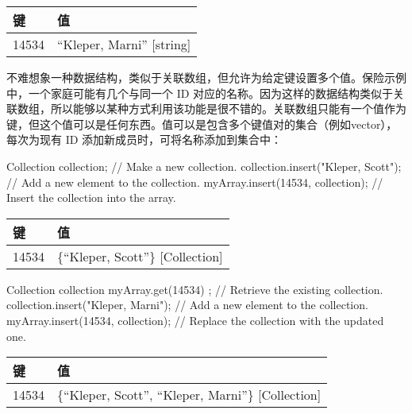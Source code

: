\begin{longtable}{|l|l|}
\hline
\textbf{键} & \textbf{值}              \\ \hline
\endfirsthead
%
\endhead
%
14534         & “Kleper, Marni” {[}string{]} \\ \hline
\end{longtable}

不难想象一种数据结构，类似于关联数组，但允许为给定键设置多个值。保险示例中，一个家庭可能有几个与同一个 ID 对应的名称。因为这样的数据结构类似于关联数组，所以能够以某种方式利用该功能是很不错的。关联数组只能有一个值作为键，但这个值可以是任何东西。值可以是包含多个键值对的集合（例如vector），每次为现有 ID 添加新成员时，可将名称添加到集合中：

\begin{cpp}
Collection collection; // Make a new collection.
collection.insert("Kleper, Scott"); // Add a new element to the collection.
myArray.insert(14534, collection); // Insert the collection into the array.
\end{cpp}

\begin{longtable}{|l|l|}
\hline
\textbf{键} & \textbf{值}                      \\ \hline
\endfirsthead
%
\endhead
%
14534         & \{“Kleper, Scott”\} {[}Collection{]} \\ \hline
\end{longtable}

\begin{cpp}
Collection collection { myArray.get(14534) }; // Retrieve the existing collection.
collection.insert("Kleper, Marni"); // Add a new element to the collection.
myArray.insert(14534, collection); // Replace the collection with the updated one.
\end{cpp}

\begin{longtable}{|l|l|}
\hline
\textbf{键} & \textbf{值}                                       \\ \hline
\endfirsthead
%
\endhead
%
14534         & \{“Kleper, Scott”, “Kleper, Marni”\} {[}Collection{]} \\ \hline
\end{longtable}

